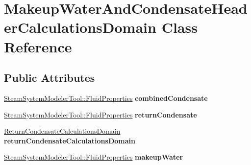 \hypertarget{class_makeup_water_and_condensate_header_calculations_domain}{}\section{Makeup\+Water\+And\+Condensate\+Header\+Calculations\+Domain Class Reference}
\label{class_makeup_water_and_condensate_header_calculations_domain}
\subsection*{Public Attributes}
\begin{DoxyCompactItemize}
\item 
\mbox{\label{class_makeup_water_and_condensate_header_calculations_domain_ad17d59fc5f9a80832987d8138c58a5ad}} 
\hyperlink{struct_steam_system_modeler_tool_1_1_fluid_properties}{Steam\+System\+Modeler\+Tool\+::\+Fluid\+Properties} {\bfseries combined\+Condensate}
\item 
\mbox{\label{class_makeup_water_and_condensate_header_calculations_domain_ae87f895c2170b2905c3b53d44a78ef36}} 
\hyperlink{struct_steam_system_modeler_tool_1_1_fluid_properties}{Steam\+System\+Modeler\+Tool\+::\+Fluid\+Properties} {\bfseries return\+Condensate}
\item 
\mbox{\label{class_makeup_water_and_condensate_header_calculations_domain_aea7e4dd118f9004bb3247068da5717e2}} 
\hyperlink{class_return_condensate_calculations_domain}{Return\+Condensate\+Calculations\+Domain} {\bfseries return\+Condensate\+Calculations\+Domain}
\item 
\mbox{\label{class_makeup_water_and_condensate_header_calculations_domain_acc56ceecd9738c99d4455123555b8249}} 
\hyperlink{struct_steam_system_modeler_tool_1_1_fluid_properties}{Steam\+System\+Modeler\+Tool\+::\+Fluid\+Properties} {\bfseries makeup\+Water}
\item 
\mbox{\label{class_makeup_water_and_condensate_header_calculations_domain_a02b9934cec9b31195ca808b3be92d60a}} 

\end{DoxyCompactItemize}
